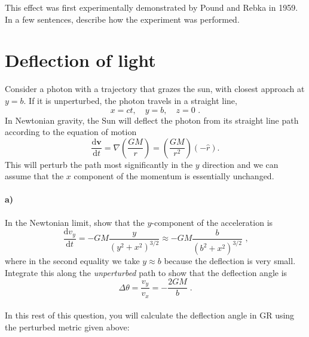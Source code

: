 \documentclass[12pt]{article}
\newcommand\diff{\mathrm{d}}
\begin{document}
This effect was first experimentally demonstrated by Pound and Rebka in 1959. In
a few sentences, describe how the experiment was performed.

\section{Deflection of light}

Consider a photon with a trajectory that grazes the sun, with closest approach
at $y = b$. If it is unperturbed, the photon travels in a straight line,
\begin{equation}
    x = ct, \quad y = b, \quad z = 0 \text{ .}
\end{equation}
In Newtonian gravity, the Sun will deflect the photon from its straight line
path according to the equation of motion
\begin{equation}
    \frac{\diff\mathbf{v}}{\diff t} = \nabla\left(\frac{GM}{r}\right)
    = \left(\frac{GM}{r^2}\right) \left(- \hat{r}\right) \text{.}
\end{equation}
This will perturb the path most significantly in the $y$ direction and we can
assume that the $x$ component of the momentum is essentially unchanged.

\paragraph{a)} In the Newtonian limit, show that the $y$-component of the acceleration is
\begin{equation}
    \frac{\diff v_y}{\diff t} = - G M \frac{y}{\left(y^2 + x^2\right)^{3/2}}
    \approx - G M \frac{b}{\left(b^2 + x^2\right)^{3/2}} \text{ ,}
\end{equation}
where in the second equality we take $y \approx b$ because the deflection is
very small.
Integrate this along the \emph{unperturbed} path to show that the deflection angle is
\begin{equation}
    \Delta \theta = \frac{v_y}{v_x} = - \frac{2 G M}{b} \; .
\end{equation} \\[10pt]
In this rest of this question, you will calculate the deflection angle in GR using the
perturbed metric given above:
\end{document}

